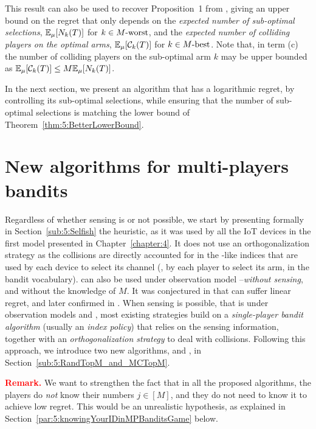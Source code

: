 This result can also be used to recover Proposition~1 from \cite{Anandkumar11}, giving an upper bound on the regret that only depends on
the \emph{expected number of sub-optimal selections}, $\mathbb{E}_{\mu}[N_k(T)]$ for $k \in M\text{-}\mathrm{worst}$,
and the \emph{expected number of colliding players on the optimal arms}, $\mathbb{E}_{\mu}[\mathcal{C}_k(T)]$ for $k \in M\text{-}\mathrm{best}$. Note that, in term (c) the number of colliding players on the sub-optimal arm $k$ may be upper bounded as $\mathbb{E}_{\mu}[\mathcal{C}_k(T)] \leq M \mathbb{E}_{\mu}[N_k(T)]$.
%

In the next section, we present an algorithm that has a logarithmic regret,
by controlling its sub-optimal selections,
while ensuring that the number of sub-optimal selections is matching the lower bound of Theorem~\ref{thm:5:BetterLowerBound}.



\section{New algorithms for multi-players bandits}
\label{sec:5:algorithms}


Regardless of whether sensing is or not possible, we start by presenting formally in Section~\ref{sub:5:Selfish} the \Selfish{} heuristic, as it was used by all the IoT devices in the first model presented in Chapter~\ref{chapter:4}.
It does not use an orthogonalization strategy as the collisions are directly accounted for in the \UCB-like indices that are used by each device to select its channel (\ie, by each player to select its arm, in the bandit vocabulary).
\Selfish{} can also be used under observation model \modeltrois{} --\emph{without sensing}, and without the knowledge of $M$.
It was conjectured in \cite{Besson2018ALT} that \Selfish{} can suffer linear regret, and later confirmed in \cite{LugosiMehrabian18,BoursierPerchet18}.
%
When sensing is possible, that is under observation models \modelun{} and \modeldeux, most existing strategies build on a \emph{single-player bandit algorithm} (usually an \emph{index policy}) that relies on the sensing information, together with an \emph{orthogonalization strategy} to deal with collisions.
Following this approach, we introduce two new algorithms, \RandTopM{} and \MCTopM, in Section~\ref{sub:5:RandTopM_and_MCTopM}.


\begin{leftbar}[warningbar]  %
  \textcolor{red}{\textbf{Remark.}}
  We want to strengthen the fact that in all the proposed algorithms,
  the players do \emph{not} know their numbers $j\in[M]$,
  and they do not need to know it to achieve low regret.
  This would be an unrealistic hypothesis, as explained in Section~\ref{par:5:knowingYourIDinMPBanditsGame} below.
\end{leftbar}  %


